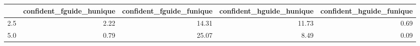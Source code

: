 \begin{tabular}{lrrrr}
\toprule
 & confident_fguide_hunique & confident_fguide_funique & confident_hguide_hunique & confident_hguide_funique \\
\midrule
2.5 & 2.22 & 14.31 & 11.73 & 0.69 \\
5.0 & 0.79 & 25.07 & 8.49 & 0.09 \\
\bottomrule
\end{tabular}
